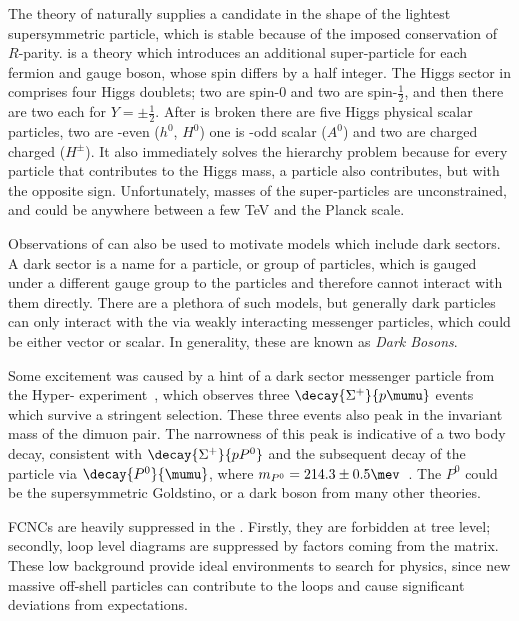 
The theory of \SUSY naturally supplies a \dm candidate in the shape of the lightest supersymmetric particle,
which is stable because of the imposed conservation of $R$-parity.
\SUSY is a theory which introduces an additional super-particle for each \sm fermion and
gauge boson, whose spin differs by a half integer.
The Higgs sector in \SUSY comprises four Higgs doublets; two are spin-0 and two are spin-$\tfrac12$,
and then there are two each for $Y=\pm\tfrac12$.
After \SUSY is broken there are five Higgs physical scalar particles, two are \CP-even ($h^0$,
$H^0$) one is \CP-odd scalar ($A^0$) and two are charged charged ($H^\pm$).
It also immediately solves the hierarchy problem because for every \sm particle that contributes to
the Higgs mass, a \SUSY particle also contributes, but with the opposite sign.
Unfortunately, masses of the super-particles are unconstrained, and could be anywhere between a few
TeV and the Planck scale.

Observations of \dm can also be used to motivate \bsm models which include dark sectors.
A dark sector is a name for a particle, or group of particles, which is gauged under a
different gauge group to the \sm particles and therefore cannot interact with them directly.
There are a plethora of such models, but generally dark particles can only interact with the \sm
via weakly interacting messenger particles, which could be either vector or scalar.
In generality, these are known as \emph{Dark Bosons}.

Some excitement was caused by a hint of a dark sector messenger particle from the Hyper-\CP
experiment~\cite{Burnstein:2004uk}, which observes three $\decay{\Sigma^+}{p\mumu}$ events which
survive a stringent selection.
These three events also peak in the invariant mass of the dimuon pair.
The narrowness of this peak is indicative of a two body decay, consistent with  $\decay{\Sigma^+}{pP^0}$
and the subsequent decay of the \np particle via $\decay{P^0}{\mumu}$, where
$m_{P^0}=214.3\pm0.5\mev$~\cite{Park:2005eka}.
The $P^0$ could be the supersymmetric Goldstino, or a dark boson from many other theories.

\glspl{FCNC} are heavily suppressed in the \sm.
Firstly, they are forbidden at tree level; secondly, loop level diagrams are suppressed by factors
coming from the \ckm matrix.
These low background provide ideal environments to search for \bsm physics, since new massive
off-shell particles can contribute to the loops and cause significant deviations from \sm
expectations.

